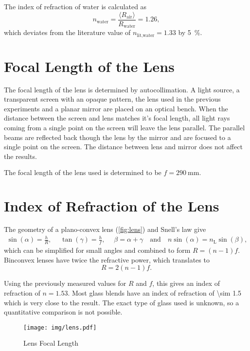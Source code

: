The index of refraction of water is calculated as
\begin{equation*}
	n_\text{water} = \frac{\langle R_\text{air} \rangle}{R_\text{water}} = \num{1.26},
\end{equation*}
which deviates from the literature value of $n_\text{lit,water} = \num{1.33}$ by \SI{5}{\percent}.

\section{Focal Length of the Lens}

The focal length of the lens is determined by autocollimation.
A light source, a transparent screen with an opaque pattern, the lens used in the previous experiments and a planar mirror are placed on an optical bench.
When the distance between the screen and lens matches it's focal length, all light rays coming from a single point on the screen will leave the lens parallel.
The parallel beams are reflected back though the lens by the mirror and are focused to a single point on the screen.
The distance between lens and mirror does not affect the results.

The focal length of the lens used is determined to be $f = \SI{290}{\mm}$.

\section{Index of Refraction of the Lens}
The geometry of a plano-convex lens (\autoref{fig:lens}) and Snell's law give
\begin{gather*}
	\sin(\alpha) = \frac{h}{R}, \quad\;
	\tan(\gamma) = \frac{h}{f}, \quad\;
	\beta = \alpha + \gamma \quad \text{and} \quad
	n \sin(\alpha) = n_\text{L} \sin(\beta),
\end{gather*}
which can be simplified for small angles and combined to form $R = \left(n - 1\right)f$.
Binconvex lenses have twice the refractive power, which translates to
\begin{equation*}
	R = 2 \left(n - 1\right)f.
\end{equation*}

Using the previously measured values for $R$ and $f$, this gives an index of refraction of $n = \num{1.53}$.
Most glass blends have an index of refraction of \num{\sim 1.5} which is very close to the result.
The exact type of glass used is unknown, so a quantitative comparison is not possible.

\begin{figure}[tbp]
	\centering
	\texttt{[image: img/lens.pdf]}
	\caption{Lens Focal Length}
	\label{fig:lens}
\end{figure}
